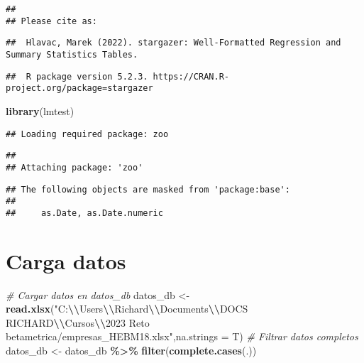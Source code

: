 \documentclass[
]{article}
\newenvironment{Shaded}{\begin{snugshade}}{\end{snugshade}}
\newcommand{\AttributeTok}[1]{\textcolor[rgb]{0.13,0.29,0.53}{#1}}
\newcommand{\CommentTok}[1]{\textcolor[rgb]{0.56,0.35,0.01}{\textit{#1}}}
\newcommand{\FunctionTok}[1]{\textcolor[rgb]{0.13,0.29,0.53}{\textbf{#1}}}
\newcommand{\NormalTok}[1]{#1}
\newcommand{\OtherTok}[1]{\textcolor[rgb]{0.56,0.35,0.01}{#1}}
\newcommand{\SpecialCharTok}[1]{\textcolor[rgb]{0.81,0.36,0.00}{\textbf{#1}}}
\newcommand{\StringTok}[1]{\textcolor[rgb]{0.31,0.60,0.02}{#1}}
\begin{document}
\begin{verbatim}
## 
## Please cite as:
\end{verbatim}

\begin{verbatim}
##  Hlavac, Marek (2022). stargazer: Well-Formatted Regression and Summary Statistics Tables.
\end{verbatim}

\begin{verbatim}
##  R package version 5.2.3. https://CRAN.R-project.org/package=stargazer
\end{verbatim}

\begin{Shaded}
\begin{Highlighting}[]
\FunctionTok{library}\NormalTok{(lmtest)}
\end{Highlighting}
\end{Shaded}

\begin{verbatim}
## Loading required package: zoo
\end{verbatim}

\begin{verbatim}
## 
## Attaching package: 'zoo'
\end{verbatim}

\begin{verbatim}
## The following objects are masked from 'package:base':
## 
##     as.Date, as.Date.numeric
\end{verbatim}

\hypertarget{carga-datos}{%
\section{Carga datos}\label{carga-datos}}

\begin{Shaded}
\begin{Highlighting}[]
\CommentTok{\# Cargar datos en datos\_db}
\NormalTok{datos\_db }\OtherTok{\textless{}{-}} \FunctionTok{read.xlsx}\NormalTok{(}\StringTok{"C:}\SpecialCharTok{\textbackslash{}\textbackslash{}}\StringTok{Users}\SpecialCharTok{\textbackslash{}\textbackslash{}}\StringTok{Richard}\SpecialCharTok{\textbackslash{}\textbackslash{}}\StringTok{Documents}\SpecialCharTok{\textbackslash{}\textbackslash{}}\StringTok{DOCS RICHARD}\SpecialCharTok{\textbackslash{}\textbackslash{}}\StringTok{Cursos}\SpecialCharTok{\textbackslash{}\textbackslash{}}\StringTok{2023 Reto betametrica/empresas\_HEBM18.xlsx"}\NormalTok{,}\AttributeTok{na.strings =}\NormalTok{ T)}
\CommentTok{\# Filtrar datos completos}
\NormalTok{datos\_db }\OtherTok{\textless{}{-}}\NormalTok{ datos\_db }\SpecialCharTok{\%\textgreater{}\%} 
  \FunctionTok{filter}\NormalTok{(}\FunctionTok{complete.cases}\NormalTok{(.))}
\end{Highlighting}
\end{Shaded}
\end{document}
